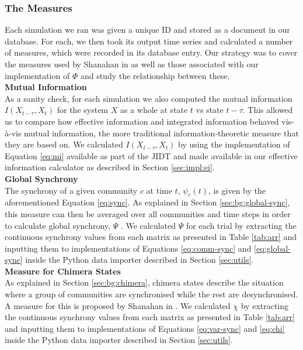 \documentclass[a4paper,11pt]{article}
\begin{document}
\subsubsection{The Measures}
\label{sec:app:osc:measures}

Each simulation we ran was given a unique ID and stored as a document in our database. For each, we then took its output time series and calculated a number of measures, which were recorded in its database entry. Our strategy was to cover the measures used by Shanahan in \cite{Shanahan2010} as well as those associated with our implementation of $\Phi$ and study the relationship between these.\\

\noindent \textbf{Mutual Information}\\
\noindent As a sanity check, for each simulation we also computed the mutual information $I(X_{t-\tau}, X_{t})$ for the system $X$ as a whole at state $t$ vs state $t-\tau$. This allowed us to compare how effective information and integrated information behaved vis-\`{a}-vis mutual information, the more traditional information-theoretic measure that they are based on. We calculated $I(X_{t-\tau}, X_{t})$ by using the implementation of Equation \ref{eq:mi} available as part of the JIDT and made available in our effective information calculator as described in Section \ref{sec:impl:ei}.\\

\noindent \textbf{Global Synchrony}\\
\noindent The synchrony of a given community $c$ at time $t$, $\psi_c(t)$, is given by the aforementioned Equation \ref{eq:sync}. As explained in Section \ref{sec:bg:global-sync}, this measure can then be averaged over all communities and time steps in order to calculate global synchrony, $\Psi$ \cite{Shanahan2010}. We calculated $\Psi$ for each trial by extracting the continuous synchrony values from each matrix as presented in Table \ref{tab:arr} and inputting them to implementations of Equations \ref{eq:comm-sync} and \ref{eq:global-sync} inside the Python data importer described in Section \ref{sec:utils}.\\

\noindent \textbf{Measure for Chimera States}\\
\noindent As explained in Section \ref{sec:bg:chimera}, chimera states describe the situation where a group of communities are synchronised while the rest are desynchronised. A measure for this is proposed by Shanahan in \cite{Shanahan2010}. We calculated $\chi$ by extracting the continuous synchrony values from each matrix as presented in Table \ref{tab:arr} and inputting them to implementations of Equations \ref{eq:var-sync} and \ref{eq:chi} inside the Python data importer described in Section \ref{sec:utils}.\\
\end{document}
